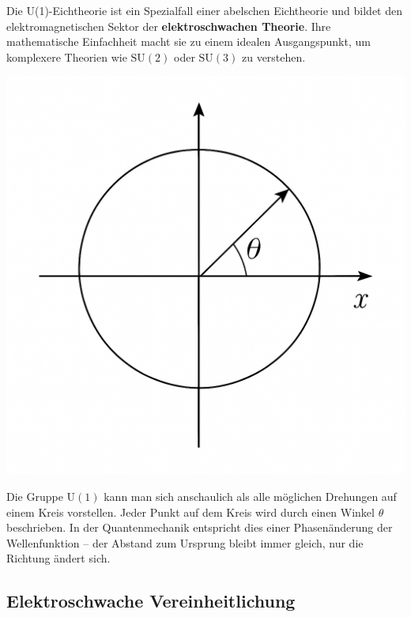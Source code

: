 Die U(1)-Eichtheorie ist ein Spezialfall einer abelschen Eichtheorie und bildet den elektromagnetischen Sektor der \textbf{elektroschwachen Theorie}.  
Ihre mathematische Einfachheit macht sie zu einem idealen Ausgangspunkt, um komplexere Theorien wie \(\mathrm{SU(2)}\) oder \(\mathrm{SU(3)}\) zu verstehen.
\medskip
\begin{tcolorbox}[didaktikbox, title=U(1) anschaulich erklärt]
	\label{box:u1_kreis}
	\small
	\begin{minipage}{0.35\linewidth}
		\centering
		\includegraphics[width=\linewidth]{bilder/u1_kreis.png}
	\end{minipage}%
	\begin{minipage}{0.63\linewidth}
		Die Gruppe \(\mathrm{U(1)}\) kann man sich anschaulich als alle möglichen
		Drehungen auf einem Kreis vorstellen.  
		Jeder Punkt auf dem Kreis wird durch einen Winkel \(\theta\) beschrieben.  
		In der Quantenmechanik entspricht dies einer Phasenänderung der Wellenfunktion
		– der Abstand zum Ursprung bleibt immer gleich, nur die Richtung ändert sich.
	\end{minipage}
\end{tcolorbox}

\subsection{Elektroschwache Vereinheitlichung}



